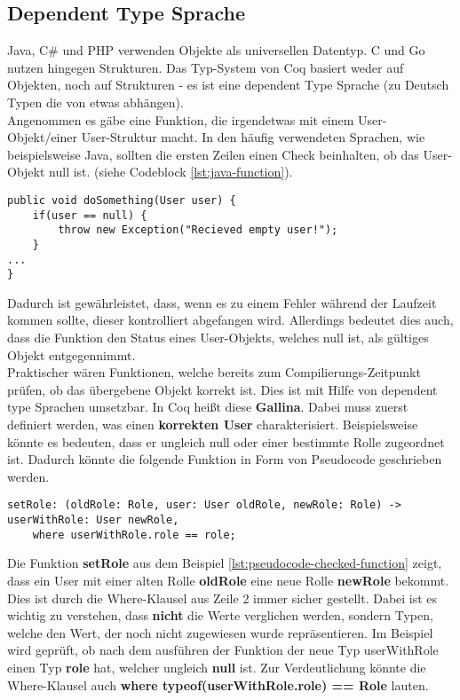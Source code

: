 \subsection{Dependent Type Sprache}
Java, C\# und PHP verwenden Objekte als universellen Datentyp. C und Go nutzen hingegen Strukturen. Das Typ-System von Coq basiert weder auf Objekten, noch auf Strukturen - es ist eine dependent Type Sprache (zu Deutsch Typen die von etwas abhängen).\\
Angenommen es gäbe eine Funktion, die irgendetwas mit einem User-Objekt/einer User-Struktur macht. In den häufig verwendeten Sprachen, wie beispielsweise Java, sollten die ersten Zeilen einen Check beinhalten, ob das User-Objekt null ist. (siehe Codeblock \ref{lst:java-function}).
\begin{lstlisting}[language=coq,firstnumber=1,caption=Java Funktion für den initialen Check auf null des User Objektes,label=lst:java-function]
public void doSomething(User user) {
	if(user == null) {
		throw new Exception("Recieved empty user!");
	}
...
}
\end{lstlisting}
Dadurch ist gewährleistet, dass, wenn es zu einem Fehler während der Laufzeit kommen sollte, dieser kontrolliert abgefangen wird. Allerdings bedeutet dies auch, dass die Funktion den Status eines User-Objekts, welches null ist, als gültiges Objekt entgegennimmt.\\
Praktischer wären Funktionen, welche bereits zum Compilierungs-Zeitpunkt prüfen, ob das übergebene Objekt korrekt ist.
Dies ist mit Hilfe von dependent type Sprachen umsetzbar. In Coq heißt diese \textbf{Gallina}. Dabei muss zuerst definiert werden, was einen \textbf{korrekten User} charakterisiert. Beispielsweise könnte es bedeuten, dass er ungleich null oder einer bestimmte Rolle zugeordnet ist. Dadurch könnte die folgende Funktion in Form von Pseudocode geschrieben werden.
\begin{lstlisting}[language=coq,firstnumber=1,caption=Pseudocode Check auf null des User Objektes,label=lst:pseudocode-checked-function]
setRole: (oldRole: Role, user: User oldRole, newRole: Role) -> userWithRole: User newRole,
	where userWithRole.role == role;
\end{lstlisting}
Die Funktion \textbf{setRole} aus dem Beispiel \ref{lst:pseudocode-checked-function} zeigt, dass ein User mit einer alten Rolle \textbf{oldRole} eine neue Rolle \textbf{newRole} bekommt. Dies ist durch die Where-Klausel aus Zeile 2 immer sicher gestellt. Dabei ist es wichtig zu verstehen, dass \textbf{nicht} die Werte verglichen werden, sondern Typen, welche den Wert, der noch nicht zugewiesen wurde repräsentieren. Im Beispiel wird geprüft, ob nach dem ausführen der Funktion der neue Typ userWithRole einen Typ \textbf{role} hat, welcher ungleich \textbf{null} ist. Zur Verdeutlichung könnte die Where-Klausel auch \textbf{where typeof(userWithRole.role) == Role} lauten.\\
